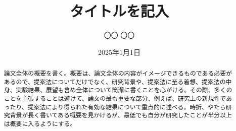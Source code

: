 \documentclass[11pt,a4paper,twoside,openany]{book}
\title{タイトルを記入}
\date{2025年1月1日}
\affiliation{一橋大学ソーシャル・データサイエンス学部}
\author{〇〇 〇〇}  %
\begin{document}
\frontmatter
\maketitle

\begin{abstract}
  論文全体の概要を書く。概要は、論文全体の内容がイメージできるものである必要があるので、提案法についてだけでなく、研究背景や、提案法に至る着想、提案法の中身、実験結果、展望も含め全体について簡潔に書くことを心がける。その際、多くのことを主張することは避けて、論文の最も重要な部分、例えば、研究上の新規性であったり、提案法により得られた有効な結果について重点的に述べる。時折、やたら研究背景が長く書いてある概要を見かけるが、最低でも自分が研究したことが半分以上は概要に入るようにする。
\end{abstract}

\tableofcontents  %
\clearpage

\listoffigures    %
\clearpage

\listoftables     %
\clearpage

\mainmatter








\begin{acks}

\end{acks}



% 
% 

\printbibliography[title=\biblioname,heading=bibintoc]


\begin{appendices}
  
  
\end{appendices}

\end{document}
